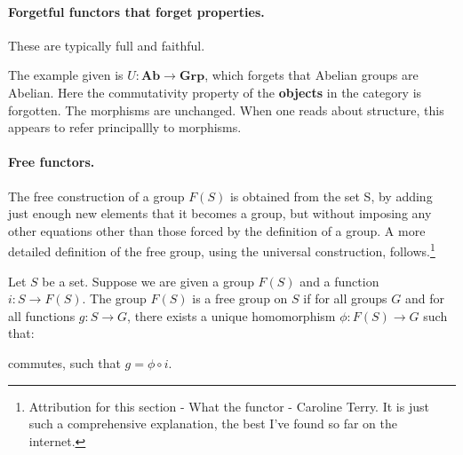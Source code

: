 \documentclass{article}
\begin{document}
\paragraph{Forgetful functors that forget properties.}

These are typically full and faithful.

The example given is $U:\textbf{Ab} \rightarrow \textbf{Grp}$, which forgets that Abelian groups are Abelian. Here the commutativity property of the \textbf{objects} in the category is forgotten. The morphisms are unchanged. When one reads about structure, this appears to refer principallly to morphisms.

\paragraph{Free functors.}

The free construction of a group $F(S)$ is obtained from the set S, by adding just enough new elements that it becomes a group, but without imposing any other equations other than those forced by the definition of a group. A more detailed definition of the free group, using the universal construction, follows.\footnote{Attribution for this section - What the functor - Caroline Terry. It is just such a comprehensive explanation, the best I've found so far on the internet.}

Let $S$ be a set. Suppose we are given a group $F(S)$ and a function
$i\colon S \rightarrow F(S)$. The group $F(S)$ is a free group on $S$ if for all groups $G$ and for all functions $g\colon S \rightarrow G$, there exists a unique homomorphism $\phi\colon F(S) \rightarrow G$ such that:

\begin{center}
\end{center}

commutes, such that $ g = \phi \circ i$.
\end{document}
